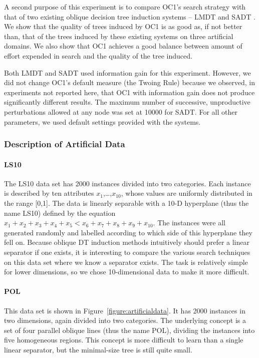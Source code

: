 A second purpose of this experiment is to compare OC1's search
strategy with that of two existing oblique decision tree induction
systems -- LMDT \cite{brodley/utgoff/92} and SADT
\cite{heath/etal/93}.  We show that the quality of trees induced by
OC1 is as good as, if not better than, that of the trees induced by
these existing systems on three artificial domains. We also show that
OC1 achieves a good balance between amount of effort expended in
search and the quality of the tree induced.

Both LMDT and SADT used information gain for this experiment. However,
we did not change OC1's default measure (the Twoing Rule) because we
observed, in experiments not reported here, that OC1 with information
gain does not produce significantly different results.  The maximum
number of successive, unproductive perturbations allowed at any node
was set at 10000 for SADT.  For all other parameters, we used default
settings provided with the systems.

\subsubsection{Description of Artificial Data}
\label{section:artificialdata}

\paragraph{LS10}
The LS10 data set has 2000 instances divided into two categories.  Each
instance is described by ten attributes $x_1$,\dots,$x_{10}$, whose
values are uniformly distributed in the range [0,1].  The data is
linearly separable with a 10-D hyperplane (thus the name LS10) defined
by the equation \(x_1+x_2+x_3+x_4+x_5 < x_6+x_7+x_8+x_9+x_{10}\).  The
instances were all generated randomly and labelled according to which
side of this hyperplane they fell on.  Because oblique DT induction
methods intuitively should prefer a linear separator if one exists, it
is interesting to compare the various search techniques on this
data set where we know a separator exists.  The task is relatively
simple for lower dimensions, so we chose 10-dimensional data to make
it more difficult.

\paragraph{POL}
This data set is shown in Figure~\ref{figure:artificialdata}. It has
2000 instances in two dimensions, again divided into two categories.
The underlying concept is a set of four parallel oblique lines (thus
the name POL), dividing the instances into five homogeneous regions.  
This concept is more difficult to learn than a single
linear separator, but the minimal-size tree is still quite small.

